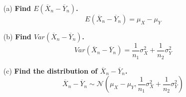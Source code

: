 \documentclass{article}
\newcommand{\N}{\mathcal{N}}
\newcommand{\olx}[1]{\overline{X}_{#1}}
\newcommand{\oly}[1]{\overline{Y}_{#1}}
\begin{document}
\begin{itemize}
	\item[(a)] \textbf{Find $E(\overline{X}_n-\overline{Y}_n)$.}
	\[
		E(\overline{X}_n-\overline{Y}_n) = \mu_X-\mu_Y
	\]
	
	\item[(b)] \textbf{Find $Var(\overline{X}_n-\overline{Y}_n)$.}
	\[
		Var(\overline{X}_n-\overline{Y}_n) = \frac{1}{n_1}\sigma_X^2+\frac{1}{n_2}\sigma_Y^2
	\]
	
	\item[(c)] \textbf{Find the distribution of $\overline{X}_n-\overline{Y}_n$.} 
	\[
		\olx{n}-\oly{n}\sim\N\left(\mu_X-\mu_Y,\frac{1}{n_1}\sigma_X^2+\frac{1}{n_2}\sigma_Y^2\right)
	\]
	
\end{itemize}	

\end{document}
